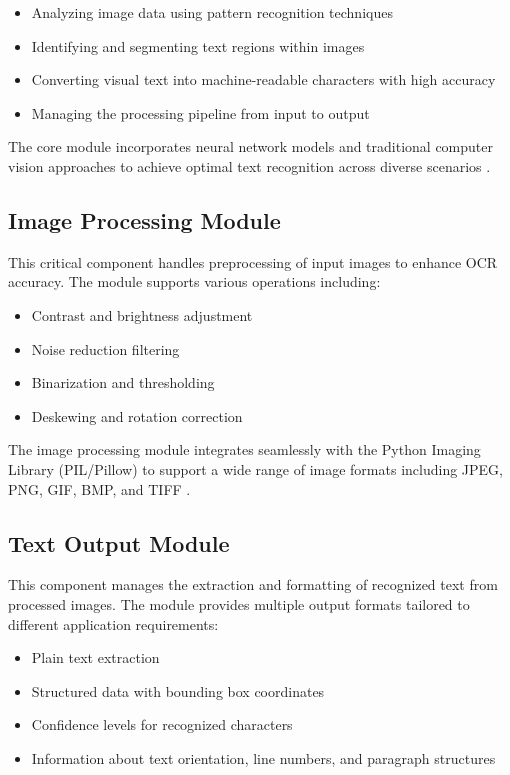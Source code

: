 \begin{itemize}
	\item Analyzing image data using pattern recognition techniques
	\item Identifying and segmenting text regions within images
	\item Converting visual text into machine-readable characters with high accuracy
	\item Managing the processing pipeline from input to output
\end{itemize}

The core module incorporates neural network models and traditional computer vision approaches to achieve optimal text recognition across diverse scenarios \cite{Nutrient.io:2025}.

\subsection{Image Processing Module}
\label{subsec:image_processing}

This critical component handles preprocessing of input images to enhance OCR accuracy. The module supports various operations including:

\begin{itemize}
	\item Contrast and brightness adjustment
	\item Noise reduction filtering
	\item Binarization and thresholding
	\item Deskewing and rotation correction
\end{itemize}

The image processing module integrates seamlessly with the Python Imaging Library (PIL/Pillow) to support a wide range of image formats including JPEG, PNG, GIF, BMP, and TIFF \cite{GeekyAnts:2023}.

\subsection{Text Output Module}
\label{subsec:text_output}

This component manages the extraction and formatting of recognized text from processed images. The module provides multiple output formats tailored to different application requirements:

\begin{itemize}
	\item Plain text extraction
	\item Structured data with bounding box coordinates
	\item Confidence levels for recognized characters
	\item Information about text orientation, line numbers, and paragraph structures
\end{itemize}

